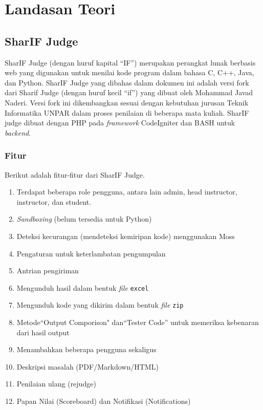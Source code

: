 \chapter{Landasan Teori}
\label{chap:teori}

\section{SharIF Judge}
\label{sec:sharifjudge} 
 
SharIF Judge \cite{SharIF_Judge} (dengan huruf kapital ``IF'') merupakan perangkat lunak berbasis web yang digunakan untuk menilai kode program dalam bahasa C, C++, Java, dan Python. SharIF Judge yang dibahas dalam dokumen ini adalah versi fork dari Sharif Judge \cite{Sharif_Judge_Original} (dengan huruf kecil ``if'') yang dibuat oleh Mohammad Javad Naderi. Versi fork ini dikembangkan sesuai dengan kebutuhan jurusan Teknik Informatika UNPAR dalam proses penilaian di beberapa mata kuliah. SharIF judge dibuat dengan PHP pada \textit{framework} CodeIgniter dan BASH untuk \textit{backend}.

\subsection{Fitur}
\label{subsec:fitur}
Berikut adalah fitur-fitur dari SharIF Judge.
\begin{enumerate}
	\item  Terdapat beberapa role pengguna, antara lain admin, head instructor, instructor, dan student.
	\item  \textit{Sandboxing} (belum tersedia untuk Python)
	\item Deteksi kecurangan (mendeteksi kemiripan kode) menggunakan Moss
	\item Pengaturan untuk keterlambatan pengumpulan
	\item Antrian pengiriman
	\item Mengunduh hasil dalam bentuk \textit{file} \verb|excel|
	\item Mengunduh kode yang dikirim dalam bentuk \textit{file} \verb|zip|
	\item Metode``Output Comporison" dan``Tester Code'' untuk memeriksa kebenaran dari hasil output
	\item Menambahkan beberapa pengguna sekaligus
	\item Deskripsi masalah (PDF/Markdown/HTML)
	\item Penilaian ulang (rejudge)
	\item Papan Nilai (Scoreboard) dan Notifikasi (Notifications)
	
\end{enumerate}

